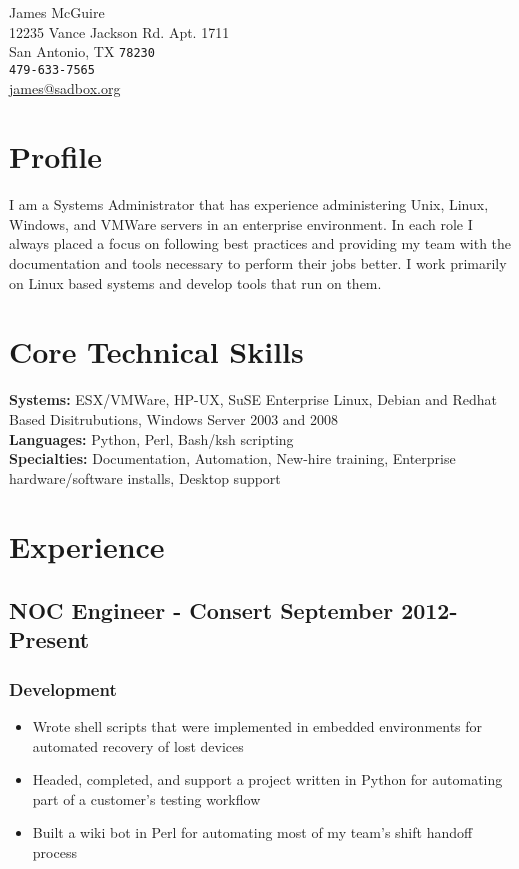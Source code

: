 \documentclass[10pt]{article}
\begin{document}
{\LARGE James McGuire}\\[0.5cm]
12235 Vance Jackson Rd. Apt. 1711\\
San Antonio, TX \texttt{78230}\\[.2cm]
\texttt{479-633-7565}\\
\href{mailto:james@sadbox.org}{james@sadbox.org}\\

\section*{Profile}
I am a Systems Administrator that has experience administering Unix, Linux, Windows, and VMWare servers in an enterprise environment. In each role I always placed a focus on following best practices and providing my team with the documentation and tools necessary to perform their jobs better. I work primarily on Linux based systems and develop tools that run on them.

\section*{Core Technical Skills}
\textbf{Systems:} ESX/VMWare, HP-UX, SuSE Enterprise Linux, Debian and Redhat Based Disitrubutions, Windows Server 2003 and 2008 \\
\textbf{Languages:} Python, Perl, Bash/ksh scripting \\
\textbf{Specialties:} Documentation, Automation, New-hire training, Enterprise hardware/software installs, Desktop support \\

\section*{Experience}
\subsection*{NOC Engineer - Consert \hfill September 2012-Present}
\subsubsection*{Development}
\begin{itemize}
    \item Wrote shell scripts that were implemented in embedded environments for automated recovery of lost devices
    \item Headed, completed, and support a project written in Python for automating part of a customer's testing workflow
    \item Built a wiki bot in Perl for automating most of my team's shift handoff process
\end{itemize}
\end{document}
